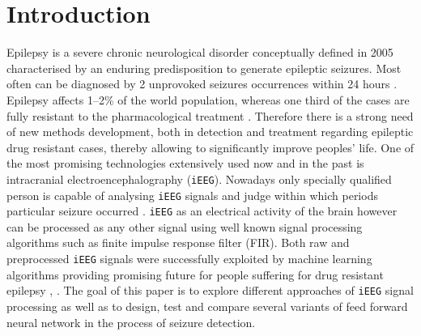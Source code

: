 \chapter{Introduction}
Epilepsy is a severe chronic neurological disorder conceptually defined in 2005 characterised by an enduring predisposition to generate epileptic seizures. Most often can be diagnosed by 2 unprovoked seizures occurrences within 24 hours \cite{what_is_epilepsy}. Epilepsy affects 1--2\% of the world population, whereas one third of the cases are fully resistant to the pharmacological treatment \cite{epilepsy_lbp}. Therefore there is a strong need of new methods  development, both in detection and treatment regarding epileptic drug resistant cases, thereby allowing to significantly improve peoples' life. One of the most promising technologies extensively used now and in the past is intracranial electroencephalography (\verb|iEEG|). Nowadays only specially qualified person is capable of analysing \verb|iEEG| signals and judge within which periods particular seizure occurred \cite{tokyo_expert_epilepsy}. \verb|iEEG| as an electrical activity of the brain however can be processed as any other signal using well known signal processing algorithms such as finite impulse response filter (FIR). Both raw and preprocessed \verb|iEEG| signals were successfully exploited by machine learning algorithms providing promising future for people suffering for drug resistant epilepsy \cite{laelaps_long}, \cite{neural_epilepsy}. The goal of this paper is to explore different approaches of \verb|iEEG| signal processing as well as to design, test and compare several variants of feed forward neural network in the process of seizure detection.

\begingroup
\renewcommand{\cleardoublepage}{}
\renewcommand{\clearpage}{}
